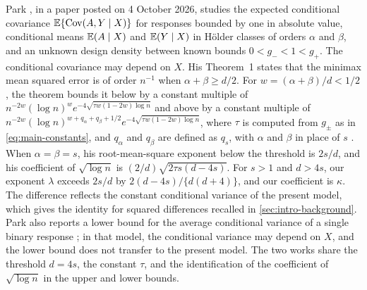 Park \cite{Park2026}, in a paper posted on 4 October 2026, studies the
expected conditional covariance
$\mathbb E\{\operatorname{Cov}(A,Y\mid X)\}$ for responses bounded by one in absolute value,
conditional means $\mathbb E(A\mid X)$ and $\mathbb E(Y\mid X)$ in H\"older classes of
orders $\alpha$ and $\beta$, and an unknown design density between known
bounds $0<g_-<1<g_+$. The conditional covariance may depend on $X$. His
Theorem~1 states that the minimax mean squared error is of order
$n^{-1}$ when $\alpha+\beta\ge d/2$. For $w=(\alpha+\beta)/d<1/2$, the
theorem bounds it below by a constant multiple of
$n^{-2w}(\log n)^we^{-4\sqrt{\tau w(1-2w)\log n}}$ and above by a
constant multiple of
$n^{-2w}(\log n)^{w+q_\alpha+q_\beta+1/2}e^{-4\sqrt{\tau w(1-2w)\log n}}$,
where $\tau$ is computed from $g_\pm$ as in \eqref{eq:main-constants},
and $q_\alpha$ and $q_\beta$ are defined as $q_s$, with $\alpha$ and
$\beta$ in place of $s$ \cite[Section~2, Theorem~1]{Park2026}. When
$\alpha=\beta=s$, his root-mean-square exponent below the threshold is
$2s/d$, and his coefficient of $\sqrt{\log n}$ is
$(2/d)\sqrt{2\tau s(d-4s)}$. For $s>1$ and $d>4s$, our exponent
$\lambda$ exceeds $2s/d$ by $2(d-4s)/\{d(d+4)\}$, and our coefficient is
$\kappa$. The difference reflects the constant conditional variance of
the present model, which gives the identity for squared differences
recalled in \cref{sec:intro-background}. Park also reports a lower
bound for the average conditional variance of a single binary response
\cite[Section~2]{Park2026}; in that model, the conditional variance may
depend on $X$, and the lower bound does not transfer to the present
model. The two works share the threshold $d=4s$, the constant $\tau$,
and the identification of the coefficient of $\sqrt{\log n}$ in the
upper and lower bounds.

